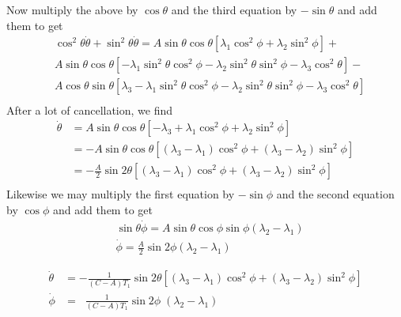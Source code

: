 \documentclass[extra,mreferee]{gji}
\begin{document}
Now multiply the above by $\cos{\theta}$ and the third equation by $-\sin{\theta}$ and add them to get
\begin{equation}
\begin{aligned}
 & \cos^2{\theta}\dot{\theta} + \sin^2{\theta} \dot{\theta} =  
   A \sin{\theta} \cos{\theta} \left[ \lambda_1 \cos^2{\phi} +  \lambda_2 \sin^2{\phi} \right] + \\
  &A \sin{\theta} \cos{\theta} \left[ - \lambda_1 \sin^2{\theta}\cos^2{\phi} - \lambda_2 \sin^2{\theta}\sin^2{\phi} - \lambda_3 \cos^2{\theta} \right] - \\
  &A \cos{\theta} \sin{\theta} \left[ \lambda_3 - \lambda_1 \sin^2{\theta}\cos^2{\phi} - \lambda_2 \sin^2{\theta}\sin^2{\phi} - \lambda_3 \cos^2{\theta} \right] \\
\end{aligned}
\end{equation}
After a lot of cancellation, we find
\begin{equation}
\begin{aligned}
 \dot{\theta} &= A \sin{\theta} \cos{\theta} \left[ - \lambda_3 + \lambda_1 \cos^2{\phi} + \lambda_2 \sin^2{\phi} \right] \\
              &= - A \sin{\theta} \cos{\theta} \left[ (\lambda_3 - \lambda_1) \cos^2{\phi} + (\lambda_3 - \lambda_2) \sin^2{\phi} \right] \\
              &= -\frac{A}{2} \sin{2 \theta} \left[ (\lambda_3 - \lambda_1) \cos^2{\phi} + (\lambda_3 - \lambda_2) \sin^2{\phi} \right] \\
\end{aligned}
\end{equation}
Likewise we may multiply the first equation by $-\sin{\phi}$ and the second equation by $\cos{\phi}$ and add them to get
\begin{equation}
\begin{aligned}
 & \sin{\theta} \dot{\phi} = A \sin{\theta}\cos{\phi}\sin{\phi} \left( \lambda_2 - \lambda_1 \right ) \\
& \dot{\phi} = \frac{A}{2} \sin{2 \phi} (\lambda_2-\lambda_1)
\end{aligned}
\end{equation}

\else
\fi
\begin{equation}
\begin{aligned}
\dot{\theta} &= - \frac{1}{(C-A)T_1} \sin{2 \theta} \left[ (\lambda_3-\lambda_1) \cos^2{\phi} + (\lambda_3-\lambda_2) \sin^2{\phi} \right] \\
\dot{\phi} &= \;\; \frac{1}{(C-A)T_1} \sin{2 \phi} \; (\lambda_2 - \lambda_1)
\end{aligned}
\label{eq:milankovitch}
\end{equation}
\end{document}

